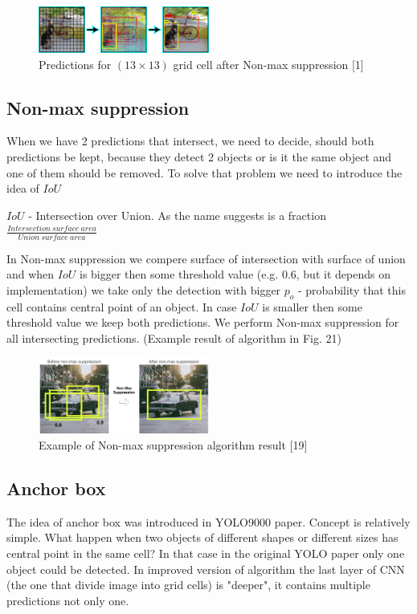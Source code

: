 \documentclass[letterpaper, 10 pt, conference]{ieeeconf}  %
\begin{document}
\begin{figure}[!ht]
	\centering
    \includegraphics[width=0.5\textwidth]{Pictures/YOLO_grid_cell.png}
	\caption{Predictions for $(13 \times 13)$ grid cell after Non-max suppression [1]}
\end{figure}

\subsection{Non-max suppression}
When we have 2 predictions that intersect, we need to decide, should both predictions be kept, because they detect 2 objects or is it the same object and one of them should be removed. To solve that problem we need to introduce the idea of $IoU$

$IoU$ - Intersection over Union. As the name suggests is a fraction $\frac{Intersection \: surface \: area}{Union \: surface \: area}$

In Non-max suppression we compere surface of intersection with surface of union and when $IoU$ is bigger then some threshold value (e.g. 0.6, but it depends on implementation) we take only the detection with bigger $p_o$ - probability that this cell contains central point of an object. In case $IoU$ is smaller then some threshold value we keep both predictions. We perform Non-max suppression for all intersecting predictions. (Example result of algorithm in Fig. 21) 

\begin{figure}[!ht]
	\centering
    \includegraphics[width=0.5\textwidth]{Pictures/Non_max_supression.png}
	\caption{Example of Non-max suppression algorithm result [19]}
\end{figure}


\subsection{Anchor box}
The idea of anchor box was introduced in YOLO9000 paper. Concept is relatively simple. What happen when two objects of different shapes or different sizes has central point in the same cell? In that case in the original YOLO paper only one object could be detected. In improved version of algorithm the last layer of CNN (the one that divide image into grid cells) is "deeper", it contains multiple predictions not only one. 
\end{document}
